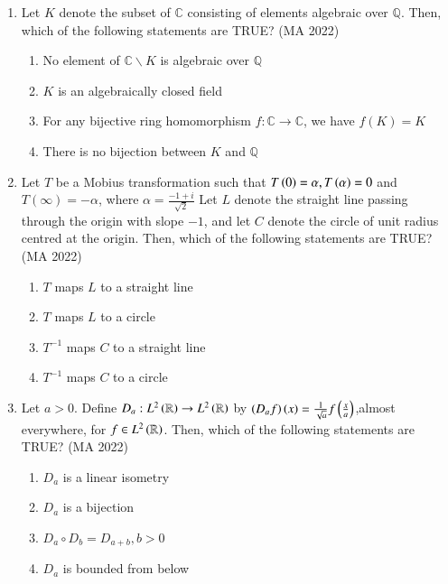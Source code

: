 \documentclass[journal,12pt,onecolumn]{IEEEtran}
\theoremstyle{remark}
\begin{document}
\begin{enumerate}
\begin{multicols}{4}
\begin{enumerate}
\item $\alpha < 3$
\item $3 \leq \alpha < 5.5$
\item $5.5 \leq \alpha < 7$
\item $\alpha \geq 7$
\end{enumerate}
\end{multicols}
\item Let $K$ denote the subset of $\mathbb{C}$ consisting of elements algebraic over $\mathbb{Q}$. Then, which
of the following statements are TRUE?
\hfill{(MA 2022)}
\begin{enumerate}
\item No element of $\mathbb{C}\backslash K$ is algebraic over $\mathbb{Q}$
\item $K$ is an algebraically closed field
\item For any bijective ring homomorphism $f : \mathbb{C} \rightarrow \mathbb{C} $, we have $f(K)=K$
\item There is no bijection between $K$ and $\mathbb{Q}$
\end{enumerate}
\item Let $T$ be a Mobius transformation such that $T\left(0\right)=\alpha,T\left(\alpha\right)=0$ and $T(\infty)=-\alpha $, where $\alpha = \frac{-1+i}{\sqrt{2}}$ Let $L$ denote the straight line passing through the origin with slope  $-1$, and let $C$ denote the circle of unit radius centred at the origin. Then, which of the following statements are TRUE?
\hfill{(MA 2022)}
\begin{enumerate}
\item $T$ maps $L$ to a straight line
\item $T$ maps $L$ to a circle
\item $T^{-1}$ maps $C$ to a straight line
\item $T^{-1}$ maps $C$ to a circle
\end{enumerate}
\item Let $a>0$. Define $D_a : L^2\left(\mathbb{R}\right) \rightarrow L^2\left(\mathbb{R}\right)$ by $\left(D_af\right)\left(x\right)=\frac{1}{\sqrt{a}}f\left(\frac{x}{a}\right)$,almost everywhere, for $f \in L^2\left(\mathbb{R}\right)$. Then, which of the following statements are TRUE?
\hfill{(MA 2022)}
\begin{enumerate}
\item $D_a$ is a linear isometry
\item $D_a$ is a bijection
\item $D_a \circ D_b=D_{a+b},b>0$
\item $D_a$ is bounded from below

\end{enumerate}
\end{enumerate}
\end{document}
